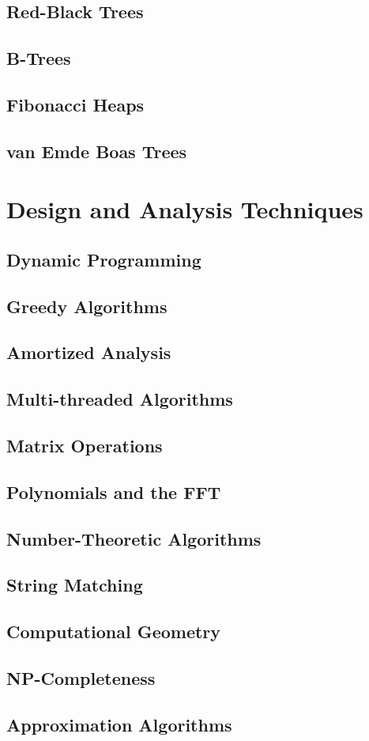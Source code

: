 		\section{Red-Black Trees}

		\section{B-Trees}

		\section{Fibonacci Heaps}

		\section{van Emde Boas Trees}

	\chapter{Design and Analysis Techniques}
		\section{Dynamic Programming}

		\section{Greedy Algorithms}

		\section{Amortized Analysis}

		\section{Multi-threaded Algorithms}

		\section{Matrix Operations}

		\section{Polynomials and the FFT}

		\section{Number-Theoretic Algorithms}

		\section{String Matching}

		\section{Computational Geometry}

		\section{NP-Completeness}

		\section{Approximation Algorithms}
